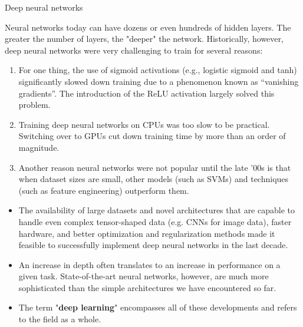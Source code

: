 \begin{vbframe}{Deep neural networks}

Neural networks today can have dozens or even hundreds of hidden layers. The greater the number of layers, the "deeper" the network. Historically, however, deep neural networks were very challenging to train for several reasons:
\lz
\begin{enumerate}
\item For one thing, the use of sigmoid activations (e.g., logistic sigmoid and tanh) significantly slowed down training due to a phenomenon known as \enquote{vanishing gradients}. The introduction of the ReLU activation largely solved this problem.
\item Training deep neural networks on CPUs was too slow to be practical. Switching over to GPUs cut down training time by more than an order of magnitude.
\item Another reason neural networks were not popular until the late '00s is that when dataset sizes are small, other models (such as SVMs) and techniques (such as feature engineering) outperform them. 
\end{enumerate}
\framebreak
\begin{itemize}
\item The availability of large datasets and novel architectures that are capable to handle even complex tensor-shaped data (e.g. CNNs for image data), faster hardware, and better optimization and regularization methods made it feasible to successfully implement deep neural networks in the last decade.
\lz

\item An increase in depth often translates to an increase in performance on a given task. State-of-the-art neural networks, however, are much more sophisticated than the simple architectures we have encountered so far.

\lz
\item The term "\textbf{deep learning}" encompasses all of these developments and refers to the field as a whole.
\end{itemize}
\end{vbframe}

\endlecture